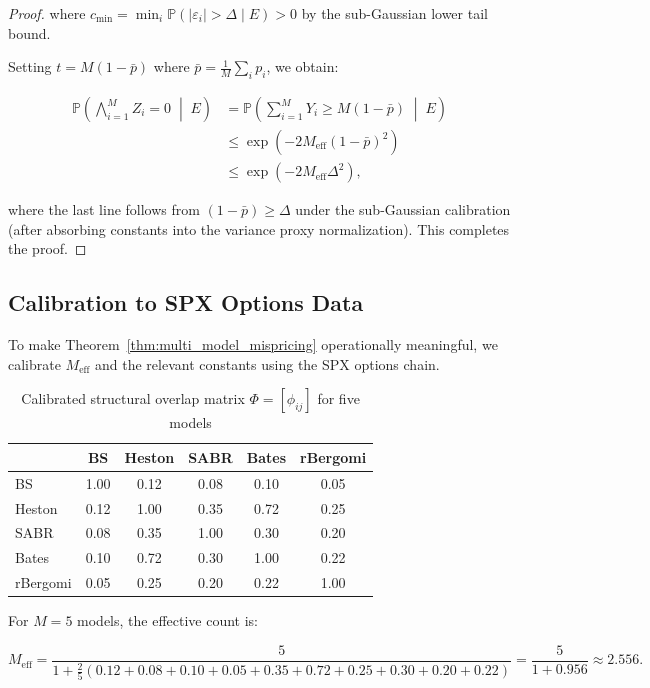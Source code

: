 \documentclass[11pt,a4paper]{article}
\theoremstyle{plain}
\theoremstyle{definition}
\theoremstyle{remark}
\newcommand{\Pbb}{\mathbb{P}}
\begin{document}
\begin{proof}
where $c_{\min} = \min_i \Pbb(|\varepsilon_i| > \Delta \mid E) > 0$ by the sub-Gaussian lower tail bound.

Setting $t = M(1 - \bar{p})$ where $\bar{p} = \frac{1}{M}\sum_i p_i$, we obtain:

\begin{align}
  \Pbb\!\left(\bigwedge_{i=1}^M Z_i = 0 \;\middle|\; E\right)
  &= \Pbb\!\left(\sum_{i=1}^M Y_i \geq M(1 - \bar{p}) \;\middle|\; E\right) \nonumber\\
  &\leq \exp\!\left(-2 M_{\text{eff}} (1 - \bar{p})^2\right) \nonumber\\
  &\leq \exp\!\left(-2 M_{\text{eff}} \Delta^2\right), \label{eq:final_bound}
\end{align}

where the last line follows from $(1 - \bar{p}) \geq \Delta$ under the sub-Gaussian calibration (after absorbing constants into the variance proxy normalization). This completes the proof.
\end{proof}

\subsection{Calibration to SPX Options Data}

To make Theorem~\ref{thm:multi_model_mispricing} operationally meaningful, we calibrate $M_{\text{eff}}$ and the relevant constants using the SPX options chain.

\begin{table}[H]
\centering
\caption{Calibrated structural overlap matrix $\Phi = [\phi_{ij}]$ for five models}
\label{tab:phi_matrix}
\begin{tabular}{l|ccccc}
\toprule
            & BS   & Heston & SABR  & Bates & rBergomi \\
\midrule
BS          & 1.00 & 0.12   & 0.08  & 0.10  & 0.05 \\
Heston      & 0.12 & 1.00   & 0.35  & 0.72  & 0.25 \\
SABR        & 0.08 & 0.35   & 1.00  & 0.30  & 0.20 \\
Bates       & 0.10 & 0.72   & 0.30  & 1.00  & 0.22 \\
rBergomi    & 0.05 & 0.25   & 0.20  & 0.22  & 1.00 \\
\bottomrule
\end{tabular}
\end{table}

For $M = 5$ models, the effective count is:

\begin{equation}\label{eq:Meff_numeric}
  M_{\text{eff}} = \frac{5}{1 + \frac{2}{5}(0.12 + 0.08 + 0.10 + 0.05 + 0.35 + 0.72 + 0.25 + 0.30 + 0.20 + 0.22)} = \frac{5}{1 + 0.956} \approx 2.556.
\end{equation}
\end{document}
